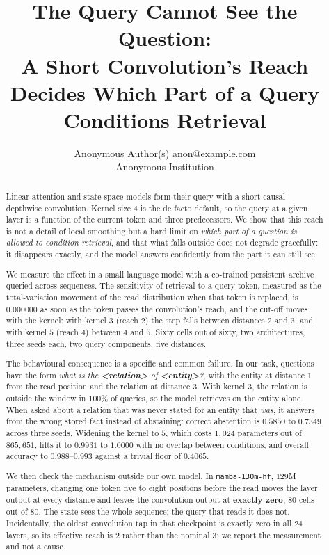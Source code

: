 \documentclass[10pt]{article}
\title{The Query Cannot See the Question:\\
A Short Convolution's Reach Decides Which Part of a Query Conditions Retrieval}
\author{\name Anonymous Author(s) \email anon@example.com \\
      \addr Anonymous Institution}
\begin{document}
\maketitle

\begin{abstract}
\noindent
Linear-attention and state-space models form their query with a short causal depthwise convolution.
Kernel size $4$ is the de facto default, so the query at a given layer is a function of the current
token and three predecessors. We show that this reach is not a detail of local smoothing but a hard limit on
\emph{which part of a question is allowed to condition retrieval}, and that what falls outside does
not degrade gracefully: it disappears exactly, and the model answers confidently from the part it can
still see.

We measure the effect in a small language model with a co-trained persistent archive queried across
sequences. The sensitivity of retrieval to a query token, measured as the total-variation movement of
the read distribution when that token is replaced, is $\mathbf{0.000000}$ as soon as the token passes
the convolution's reach, and the cut-off moves with the kernel: with kernel $3$ (reach $2$) the step
falls between distances $2$ and $3$, and with kernel $5$ (reach $4$) between $4$ and $5$. Sixty cells
out of sixty, two architectures, three seeds each, two query components, five distances.

The behavioural consequence is a specific and common failure. In our task, questions have the form
\emph{what is the \textbf{<relation>} of \textbf{<entity>}?}, with the entity at distance $1$ from the
read position and the relation at distance $3$. With kernel $3$, the relation is outside the window in
$100\%$ of queries, so the model retrieves on the entity alone. When asked about a relation that was
never stated for an entity that \emph{was}, it answers from the wrong stored fact instead of
abstaining: correct abstention is $0.5850$ to $0.7349$ across three seeds. Widening the kernel to $5$,
which costs $1{,}024$ parameters out of $865{,}651$, lifts it to $\mathbf{0.9931}$ to
$\mathbf{1.0000}$ with no overlap between conditions, and overall accuracy to $0.988$--$0.993$ against
a trivial floor of $0.4065$.

We then check the mechanism outside our own model. In \texttt{mamba-130m-hf}, $129$M parameters,
changing one token five to eight positions before the read moves the layer output at every distance
and leaves the convolution output at \textbf{exactly zero}, $80$ cells out of $80$. The state sees the
whole sequence; the query that reads it does not. Incidentally, the oldest convolution tap in that
checkpoint is exactly zero in all $24$ layers, so its effective reach is $2$ rather than the nominal
$3$; we report the measurement and not a cause.


\end{abstract}
\end{document}
